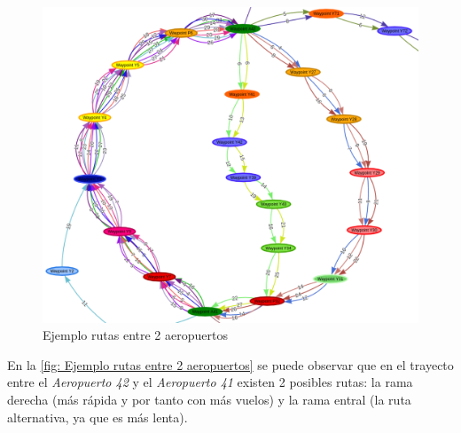 \begin{figure}[H]
	\begin{center}
		\centering
		\includegraphics[width=1\textwidth]{./imagenes/resultados/representacionGrafica.png}
		\caption{Ejemplo rutas entre 2 aeropuertos}
		\label{fig: Ejemplo rutas entre 2 aeropuertos}
	\end{center}
\end{figure}

En la \autoref{fig: Ejemplo rutas entre 2 aeropuertos} se puede observar que en el trayecto entre el \textit{Aeropuerto 42} y el \textit{Aeropuerto 41} existen 2 posibles rutas: la rama derecha (más rápida y por tanto con más vuelos) y la rama entral (la ruta alternativa, ya que es más lenta).